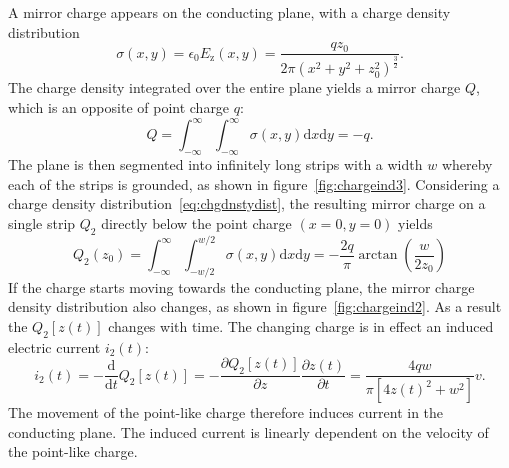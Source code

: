 A mirror charge appears on the conducting plane, with a charge density distribution
\begin{equation}
\label{eq:chgdnstydist}
\sigma(x,y)=\epsilon_\mathrm{0}E_\mathrm{z}(x,y)=\frac{qz_\mathrm{0}}{2\pi(x^2+y^2+z_0^2)^\frac{3}{2}}.
\end{equation}
The charge density integrated over the entire plane yields a mirror charge $Q$, which is an opposite of point charge $q$:
\begin{equation}
\label{eq:chargedensity}
Q=\int_{-\infty}^{\infty} \int_{-\infty}^{\infty} \sigma(x,y)\mathrm{d}x\mathrm{d}y = -q.
\end{equation}
The plane is then segmented into infinitely long strips with a width $w$ whereby each of the strips is grounded, as shown in figure~\ref{fig:chargeind3}. Considering a charge density distribution~\ref{eq:chgdnstydist}, the resulting mirror charge on a single strip $Q_\mathrm{2}$ directly below the point charge $(x=0, y=0)$ yields
\begin{equation}
\label{eq:stripcharge}
Q_\mathrm{2}(z_\mathrm{0})=\int_{-\infty}^{\infty}\int_{-w/2}^{w/2}\sigma(x,y)\mathrm{d}x\mathrm{d}y = -\frac{2q}{\pi}\arctan\left(\frac{w}{2z_\mathrm{0}}\right)
\end{equation} 
If the charge starts moving towards the conducting plane, the mirror charge density distribution also changes, as shown in figure~\ref{fig:chargeind2}. As a result the $Q_2[z(t)]$ changes with time. The changing charge is in effect an induced electric current $i_2(t)$:
 \begin{equation}
 \label{eq:indcurr}
 i_2(t) = -\frac{\mathrm{d}}{\mathrm{d}t}Q_\mathrm{2}[z(t)] = -\frac{\partial Q_\mathrm{2}[z(t)]}{\partial z}\frac{\partial z(t)}{\partial t} = \frac{4qw}{\pi[4z(t)^2 + w^2]}v. 
 \end{equation}
 The movement of the point-like charge therefore induces current in the conducting plane. The induced current is linearly dependent on the velocity of the point-like charge.

